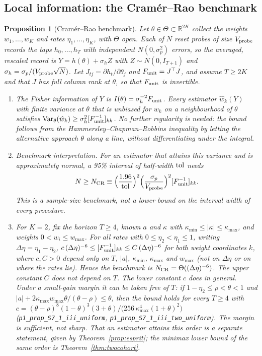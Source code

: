 \documentclass[12pt]{article}
\newtheorem{proposition}[theorem]{Proposition}
\theoremstyle{definition}
\theoremstyle{remark}
\newcommand{\R}{\mathbb{R}}
\begin{document}
\subsection{Local information: the Cram\'er--Rao benchmark}

\begin{proposition}[Cram\'er--Rao benchmark]\label{prop:crb}
Let $\theta\in\Theta\subset\R^{2K}$ collect the weights $w_1,\ldots,w_K$ and rates $\eta_1,\ldots,\eta_K$, with $\Theta$ open. Each of $N$ reset probes of size $V_{\rm probe}$ records the taps $h_0,\ldots,h_T$ with independent $N(0,\sigma_p^2)$ errors, so the averaged, rescaled record is $Y=h(\theta)+\sigma_hZ$ with $Z\sim N(0,I_{T+1})$ and $\sigma_h=\sigma_p/(V_{\rm probe}\sqrt N)$. Let $J_{tj}=\partial h_t/\partial\theta_j$ and $F_{\rm unit}=J^\top J$, and assume $T\ge2K$ and that $J$ has full column rank at $\theta$, so that $F_{\rm unit}$ is invertible.
\begin{enumerate}[label=(\roman*)]
\item The Fisher information of $Y$ is $I(\theta)=\sigma_h^{-2}F_{\rm unit}$. Every estimator $\hat w_k(Y)$ with finite variance at $\theta$ that is unbiased for $w_k$ on a neighbourhood of $\theta$ satisfies ${\rm Var}_\theta(\hat w_k)\ge\sigma_h^2[F_{\rm unit}^{-1}]_{kk}$. No further regularity is needed: the bound follows from the Hammersley--Chapman--Robbins inequality by letting the alternative approach $\theta$ along a line, without differentiating under the integral.
\item \emph{Benchmark interpretation.} For an estimator that attains this variance and is approximately normal, a 95\% interval of half-width ${\rm tol}$ needs
\begin{equation}\label{eq:Ncrb}
N\ge N_{\rm CR}\equiv\Bigl(\frac{1.96}{\rm tol}\Bigr)^2\Bigl(\frac{\sigma_p}{V_{\rm probe}}\Bigr)^2[F_{\rm unit}^{-1}]_{kk}.
\end{equation}
This is a sample-size benchmark, not a lower bound on the interval width of every procedure.
\item For $K=2$, fix the horizon $T\ge4$, known $a$ and $\kappa$ with $\kappa_{\min}\le|\kappa|\le\kappa_{\max}$, and weights $0<w_i\le w_{\max}$. For all rates with $0\le\eta_2<\eta_1\le1$, writing $\Delta\eta=\eta_1-\eta_2$, $c\,(\Delta\eta)^{-6}\le[F_{\rm unit}^{-1}]_{kk}\le C\,(\Delta\eta)^{-6}$ for both weight coordinates $k$, where $c,C>0$ depend only on $T$, $|a|$, $\kappa_{\min}$, $\kappa_{\max}$ and $w_{\max}$ (not on $\Delta\eta$ or on where the rates lie). Hence the benchmark is $N_{\rm CR}=\Theta((\Delta\eta)^{-6})$. The upper constant $C$ does not depend on $T$. The lower constant $c$ does in general. Under a small-gain margin it can be taken free of $T$: if $1-\eta_2\le\rho<\theta<1$ and $|a|+2\kappa_{\max}w_{\max}\theta/(\theta-\rho)\le\theta$, then the bound holds for every $T\ge4$ with $c=(\theta-\rho)^8(1-\theta)^3(3+\theta)/\bigl(256\,\kappa_{\max}^4(1+\theta)^2\bigr)$ (\nolinkurl{p1_prop_S7_1_iii_uniform}, \nolinkurl{p1_prop_S7_1_iii_two_uniform}). The margin is sufficient, not sharp. That an estimator attains this order is a separate statement, given by Theorem~\ref{prop:esprit}; the minimax lower bound of the same order is Theorem~\ref{thm:twocohort}.

\end{enumerate}
\end{proposition}
\end{document}
